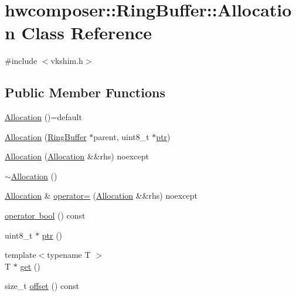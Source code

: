 \hypertarget{classhwcomposer_1_1RingBuffer_1_1Allocation}{}\section{hwcomposer\+:\+:Ring\+Buffer\+:\+:Allocation Class Reference}
\label{classhwcomposer_1_1RingBuffer_1_1Allocation}


{\ttfamily \#include $<$vkshim.\+h$>$}

\subsection*{Public Member Functions}
\begin{DoxyCompactItemize}
\item 
\mbox{\hyperlink{classhwcomposer_1_1RingBuffer_1_1Allocation_a851607ba00803ed3251242a0777603c4}{Allocation}} ()=default
\item 
\mbox{\hyperlink{classhwcomposer_1_1RingBuffer_1_1Allocation_ab9defd9d5a17793bf5bfeca346d21b43}{Allocation}} (\mbox{\hyperlink{classhwcomposer_1_1RingBuffer}{Ring\+Buffer}} $\ast$parent, uint8\+\_\+t $\ast$\mbox{\hyperlink{classhwcomposer_1_1RingBuffer_1_1Allocation_a3b2a81defb09b0aee75fdef9977a0944}{ptr}})
\item 
\mbox{\hyperlink{classhwcomposer_1_1RingBuffer_1_1Allocation_a5979a2cae091ade55e9ee39ba3ee52ee}{Allocation}} (\mbox{\hyperlink{classhwcomposer_1_1RingBuffer_1_1Allocation}{Allocation}} \&\&rhs) noexcept
\item 
\mbox{\hyperlink{classhwcomposer_1_1RingBuffer_1_1Allocation_a18406438ecf178b78dabaf9bfb4302b9}{$\sim$\+Allocation}} ()
\item 
\mbox{\hyperlink{classhwcomposer_1_1RingBuffer_1_1Allocation}{Allocation}} \& \mbox{\hyperlink{classhwcomposer_1_1RingBuffer_1_1Allocation_aa91b90b55d600b2d4ce991f51179fc74}{operator=}} (\mbox{\hyperlink{classhwcomposer_1_1RingBuffer_1_1Allocation}{Allocation}} \&\&rhs) noexcept
\item 
\mbox{\hyperlink{classhwcomposer_1_1RingBuffer_1_1Allocation_ae5c14766d266601705a6e3f261f889c6}{operator bool}} () const
\item 
uint8\+\_\+t $\ast$ \mbox{\hyperlink{classhwcomposer_1_1RingBuffer_1_1Allocation_a3b2a81defb09b0aee75fdef9977a0944}{ptr}} ()
\item 
{\footnotesize template$<$typename T $>$ }\\T $\ast$ \mbox{\hyperlink{classhwcomposer_1_1RingBuffer_1_1Allocation_acad9872f07a2e24046e945f871f26431}{get}} ()
\item 
size\+\_\+t \mbox{\hyperlink{classhwcomposer_1_1RingBuffer_1_1Allocation_ad430a1ad9261704ed10a10d6f79530fe}{offset}} () const
\end{DoxyCompactItemize}


